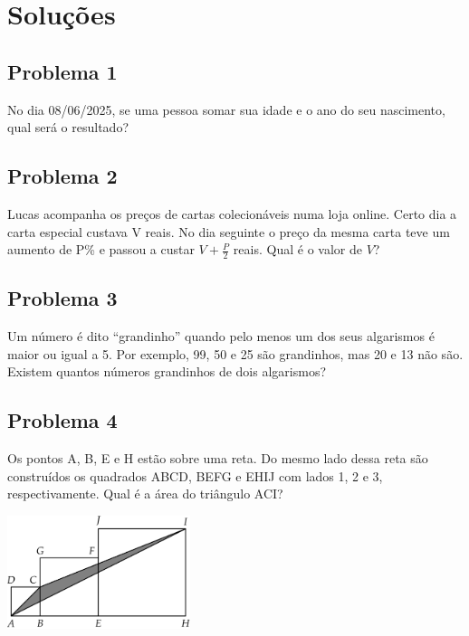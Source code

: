 \documentclass[12pt]{article}
\begin{document}
  \section{\textsf{Soluções}}
\subsection{Problema 1}
\begin{tcolorbox}[statementbox]
No dia 08/06/2025, se uma pessoa somar sua idade e o ano do seu nascimento, qual será o resultado?
\end{tcolorbox}

\clearpage

\subsection{Problema 2}
\begin{tcolorbox}[statementbox]
Lucas acompanha os preços de cartas colecionáveis numa loja online. Certo dia a carta especial custava V reais. No dia seguinte 
o preço da mesma carta teve um aumento de P\% e passou a custar \(V + \tfrac{P}{2}\) reais. Qual é o valor de \(V\)?
\end{tcolorbox}

\clearpage

\subsection{Problema 3}
\begin{tcolorbox}[statementbox]
Um número é dito “grandinho” quando pelo menos um dos seus algarismos é maior ou igual a 5. Por exemplo, 99, 50 e 25 são 
grandinhos, mas 20 e 13 não são. Existem quantos números grandinhos de dois algarismos?
\end{tcolorbox}

\clearpage

\subsection{Problema 4}
\begin{tcolorbox}[statementbox]
Os pontos A, B, E e H estão sobre uma reta. Do mesmo lado dessa reta são construídos os quadrados ABCD, BEFG e EHIJ com lados
1, 2 e 3, respectivamente. Qual é a área do triângulo ACI?
\begin{center}
  \includegraphics[width=0.4\textwidth]{first.png}
\end{center}
\end{tcolorbox}
\end{document}
